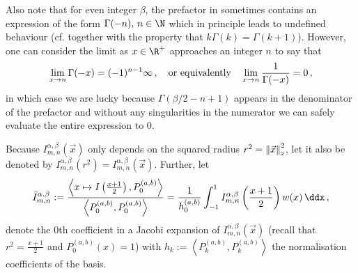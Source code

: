 Also note that for even integer $\beta$, the prefactor in  sometimes contains an expression of the form $\Gamma(-n),\, n \in \N$ which in principle leads to undefined behaviour (cf.  together with the property that $k \Gamma(k) = \Gamma(k+1)$).
However, one can consider the limit as $x \in \R^+$ approaches an integer $n$ to say that
$$\lim_{x \rightarrow n} \Gamma(-x) = (-1)^{n-1} \infty\,, \quad\text{or equivalently}\quad \lim_{x \rightarrow n} \frac{1}{\Gamma(-x)} = 0\,,$$
in which case we are lucky because $\Gamma(\beta/2-n+1)$ appears in the denominator of the prefactor and without any singularities in the numerator we can safely evaluate the entire expression to $0$.

Because $I_{m,n}^{\alpha,\beta}(\vec{x})$ only depends on the squared radius $r^2 = \left\lVert\vec{x}\right\rVert_{\scriptscriptstyle 2}^2$, let it also be denoted by $I_{m,n}^{\alpha,\beta}(r^2) = I_{m,n}^{\alpha,\beta}(\vec{x})$.
Further, let
\begin{equation}
  \bar{I}_{m,n}^{\alpha,\beta} := \frac{\left\langle x \mapsto I\left(\frac{x+1}{2}\right), P_0^{(a, b)} \right\rangle}{\left\langle P_0^{(a, b)}, P_0^{(a, b)} \right\rangle} = \frac{1}{h_0^{(a, b)}} \int_{-1}^{1} I_{m,n}^{\alpha,\beta}\left(\frac{x+1}{2}\right) w(x) \,\ddx\,,
  \label{eq:0th-coeff-of-I}
\end{equation}
denote the 0th coefficient in a Jacobi expansion of $I_{m,n}^{\alpha,\beta}(\vec{x})$ (recall that $r^2 = \frac{x+1}{2}$ and $P_0^{(a, b)}(x) = 1$) with $h_k := \left\langle P_k^{(a, b)}, P_k^{(a, b)} \right\rangle$ the normalisation coefficients of the basis.
